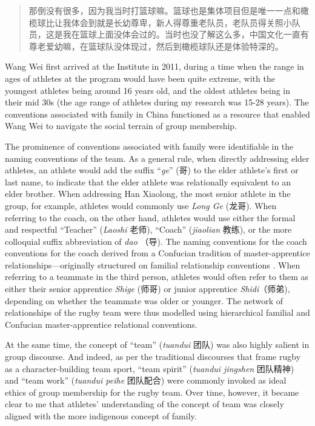 \begin{CJK}{UTF8}{gbsn}
  \begin{quotation}
     那倒没有很多，因为我当时打篮球嘛。篮球也是集体项目但是唯一一点和橄榄球比让我体会到就是长幼尊卑，新人得尊重老队员，老队员得关照小队员，这是我在篮球上面没体会过的。当时也没了解这么多，中国文化一直有尊老爱幼嘛，在篮球队没体现过，然后到橄榄球队还是体验特深的。
  \end{quotation}

Wang Wei first arrived at the Institute in 2011, during a time when the range in ages of athletes at the program would have been quite extreme, with the youngest athletes being around 16 years old, and the oldest athletes being in their mid 30s (the age range of athletes during my research was 15-28 years).  The conventions associated with family in China functioned as a resource that enabled Wang Wei to navigate the social terrain of group membership.

The prominence of conventions associated with family were identifiable in the naming conventions of the team.  As a general rule, when directly addressing elder athletes, an athlete would add the suffix ``\textit{ge}'' (哥) to the elder athlete's first or last name, to indicate that the elder athlete was relationally equivalent to an elder brother.  When addressing Han Xiaolong, the most senior athlete in the group, for example, athletes would commonly use \textit{Long Ge} (龙哥).  When referring to the coach, on the other hand, athletes would use either the formal and respectful ``Teacher'' (\textit{Laoshi} 老师), ``Coach'' (\textit{jiaolian} 教练), or the more colloquial suffix abbreviation of \textit{dao} （导). The naming conventions for the coach conventions for the coach derived from a Confucian tradition of master-apprentice relationships---originally structured on familial relationship conventions \citep{Spence1999}. When referring to a teammate in the third person, athletes would often refer to them as either their senior apprentice \textit{Shige} (师哥) or junior apprentice \textit{Shidi}（师弟), depending on whether the teammate was older or younger.  The network of relationships of the rugby team were thus modelled using hierarchical familial and Confucian master-apprentice relational conventions.

At the same time, the concept of ``team'' (\textit{tuandui} 团队) was also highly salient in group discourse. And indeed, as per the traditional discourses that frame rugby as a character-building team sport, ``team spirit'' (\textit{tuandui jingshen} 团队精神) and ``team work'' (\textit{tuandui peihe} 团队配合) were commonly invoked as ideal ethics of group membership for the rugby team.   Over time, however, it became clear to me that athletes' understanding of the concept of team was closely aligned with the more indigenous concept of family.


\end{CJK}

